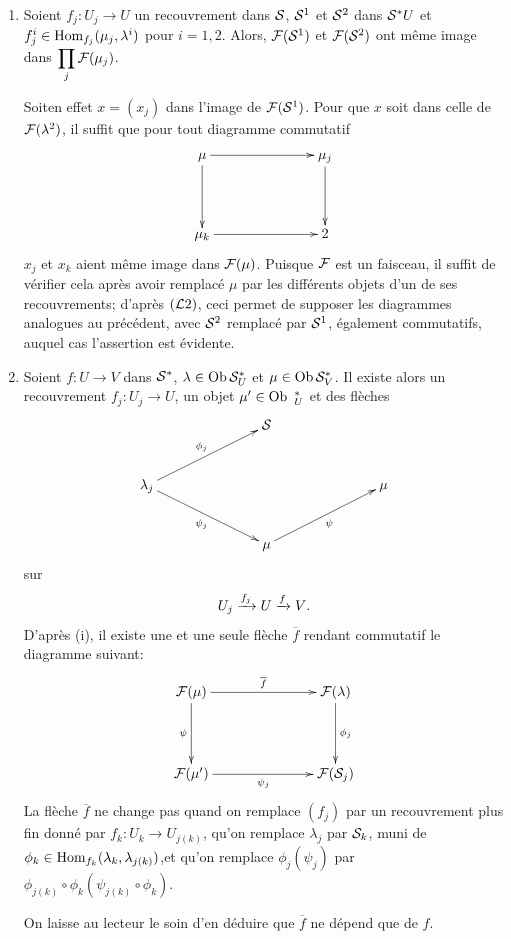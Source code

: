 \documentclass[10pt]{../fichiers-configuration-latex/smfart}
\begin{document}
\begin{enumerate}
\renewcommand{\theenumi}{\roman {enumi}}
\renewcommand{\labelenumi}{(\theenumi)}
\item Soient $f_j : U_j \to U$ un recouvrement dans ${\mathcal S}$, ${\mathcal S}^1$ et
  ${\mathcal S}^2$ dans ${\mathcal S}^{\ast}U$ et $f^i_j \in \operatorname{Hom}_{f_j}(\mu_j, \lambda^i)$ pour
  $i = 1, 2$. Alors, ${\mathcal F}({\mathcal S}^1)$ et ${\mathcal F}({\mathcal S}^2)$ ont
  même image dans $\displaystyle\mathop{\prod}_j
  {\mathcal F}(\mu_j)$.

Soit\pageoriginale en effet $x = (x_j)$ dans l'image de
${\mathcal F}({\mathcal S}^1)$. Pour
que $x$ soit dans celle de ${\mathcal F}(\lambda^2)$, il suffit que
pour tout diagramme commutatif
\[
\xymatrix@C=2.5cm@R=1.5cm{
\mu \ar[r] \ar[d]& \mu_j \ar[d]\\
\mu_k \ar[r]& 2
}
\]
$x_j$ et $x_k$ aient même image dans ${\mathcal F}(\mu)$. Puisque
${\mathcal F}$ est un faisceau, il suffit de vérifier cela après
avoir remplacé $\mu$ par les différents objets d'un de ses
recouvrements; d'après $({\mathcal L}2)$, ceci permet de supposer
les diagrammes analogues au précédent, avec ${\mathcal S}^2$ remplacé par
${\mathcal S}^1$, également commutatifs, auquel cas l'assertion est évidente.

\item Soient $f:U\to V$ dans ${\mathcal S}^{\ast}$, $\lambda \in \operatorname{Ob}
  {\mathcal S}^{\ast}_U$ et $\mu \in
  \operatorname{Ob} {\mathcal S}^{\ast}_V$. Il existe alors un recouvrement $f_j : U_j \to U$, un
  objet $\mu' \in \operatorname{Ob} {\ }^{\ast}_U$ et des flèches
\[
\xymatrix@C=2.5cm@R=1cm{
           & \Ss &\\
\lambda_j  \ar[ru]^{\phi_j} \ar[rd]_{\psi_j}&   & \mu\\
           & \mu \ar[ru]_{\psi}&
}
\]
sur
$$
U_{j}\xrightarrow{f_{j}}U\xrightarrow{f}V{}.
$$
D'après (i), il existe une et une seule flèche $\overline{f}$
rendant commutatif le diagramme suivant:
\[
\xymatrix@C=2.5cm@R=1.5cm{
\Ff(\mu)  \ar[r]^{\overline{f}} \ar[d]_{\psi}&
\Ff(\lambda) \ar[d]^{\phi_j}\\
\Ff(\mu') \ar[r]_{\psi_j}       & \Ff(\Ss_j)
}
\]
La flèche $\overline{f}$ ne change pas quand on remplace $(f_j)$
par un recouvrement plus fin donné par $f_k : U_k \to U_{j(k)}$,
qu'on remplace $\lambda_j$ par ${\mathcal S}_k$, muni de $\phi_k \in \operatorname{Hom}_{f_k}
(\lambda_k, \lambda_{j(k)})$,\pageoriginale et qu'on remplace $\phi_j(\psi_j)$ par
$\phi_{j(k)} \circ \phi_k (\psi_{j(k)} \circ \phi_k)$.

On laisse au lecteur le soin d'en déduire que $\overline{f}$ ne
dépend que de $f$.


\end{enumerate}
\end{document}
